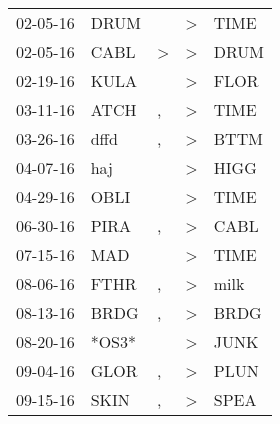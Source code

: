 \begin{supertabular}{p{0.07\textwidth}p{0.06\textwidth}p{0.02\textwidth}p{0.02\textwidth}p{0.06\textwidth}}
          02-05-16\textsuperscript{} &           DRUM\textsuperscript{} &                  &     \textgreater &           TIME\textsuperscript{} \\
          02-05-16\textsuperscript{} &           CABL\textsuperscript{} &     \textgreater &     \textgreater &           DRUM\textsuperscript{} \\
          02-19-16\textsuperscript{} &           KULA\textsuperscript{} &                  &     \textgreater &           FLOR\textsuperscript{} \\
          03-11-16\textsuperscript{} &           ATCH\textsuperscript{} &                , &     \textgreater &           TIME\textsuperscript{} \\
          03-26-16\textsuperscript{} &           dffd\textsuperscript{} &                , &     \textgreater &           BTTM\textsuperscript{} \\
          04-07-16\textsuperscript{} &            haj\textsuperscript{} &                  &     \textgreater &           HIGG\textsuperscript{} \\
          04-29-16\textsuperscript{} &           OBLI\textsuperscript{} &                  &     \textgreater &           TIME\textsuperscript{} \\
          06-30-16\textsuperscript{} &           PIRA\textsuperscript{} &                , &     \textgreater &           CABL\textsuperscript{} \\
          07-15-16\textsuperscript{} &            MAD\textsuperscript{} &                  &     \textgreater &           TIME\textsuperscript{} \\
          08-06-16\textsuperscript{} &           FTHR\textsuperscript{} &                , &     \textgreater &           milk\textsuperscript{} \\
          08-13-16\textsuperscript{} &           BRDG\textsuperscript{} &                , &     \textgreater &           BRDG\textsuperscript{} \\
          08-20-16\textsuperscript{} &                            *OS3* &                  &     \textgreater &           JUNK\textsuperscript{} \\
          09-04-16\textsuperscript{} &           GLOR\textsuperscript{} &                , &     \textgreater &           PLUN\textsuperscript{} \\
          09-15-16\textsuperscript{} &           SKIN\textsuperscript{} &                , &     \textgreater &           SPEA\textsuperscript{} \\

\end{supertabular}
